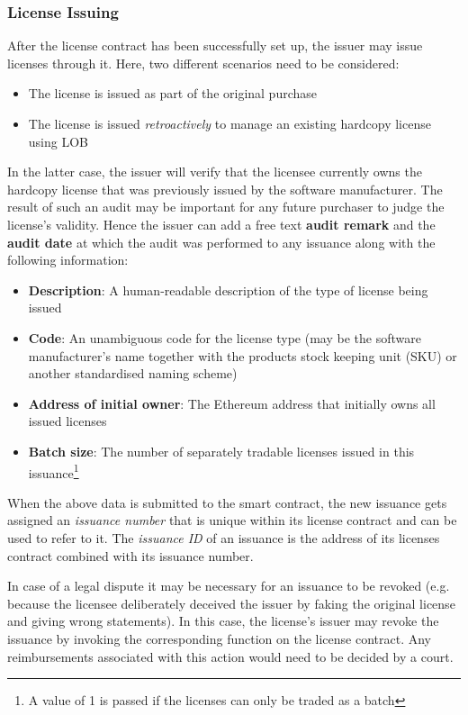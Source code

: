 \documentclass[a4paper]{article}
\begin{document}
\subsubsection{License Issuing}
\label{ch:licenseContractIssuing}

After the license contract has been successfully set up, the issuer may issue licenses through it. Here, two different scenarios need to be considered:
\begin{itemize}
  \item The license is issued as part of the original purchase
  \item The license is issued \emph{retroactively} to manage an existing hardcopy license using LOB
\end{itemize}

In the latter case, the issuer will verify that the licensee currently owns the hardcopy license that was previously issued by the software manufacturer. The result of such an audit may be important for any future purchaser to judge the license's validity. Hence the issuer can add a free text \textbf{audit remark} and the \textbf{audit date} at which the audit was performed to any issuance along with the following information:

\begin{itemize}
  \item \textbf{Description}: A human-readable description of the type of license being issued
  \item \textbf{Code}: An unambiguous code for the license type (may be the software manufacturer's name together with the products stock keeping unit (SKU) or another standardised naming scheme)
  \item \textbf{Address of initial owner}: The Ethereum address that initially owns all issued licenses
  \item \textbf{Batch size}: The number of separately tradable licenses issued in this issuance\footnote{A value of 1 is passed if the licenses can only be traded as a batch}
\end{itemize}

When the above data is submitted to the smart contract, the new issuance gets assigned an \emph{issuance number} that is unique within its license contract and can be used to refer to it. The \emph{issuance ID} of an issuance is the address of its licenses contract combined with its issuance number.

In case of a legal dispute it may be necessary for an issuance to be revoked (e.g. because the licensee deliberately deceived the issuer by faking the original license and giving wrong statements). In this case, the license's issuer may revoke the issuance by invoking the corresponding function on the license contract. Any reimbursements associated with this action would need to be decided by a court.
\end{document}
